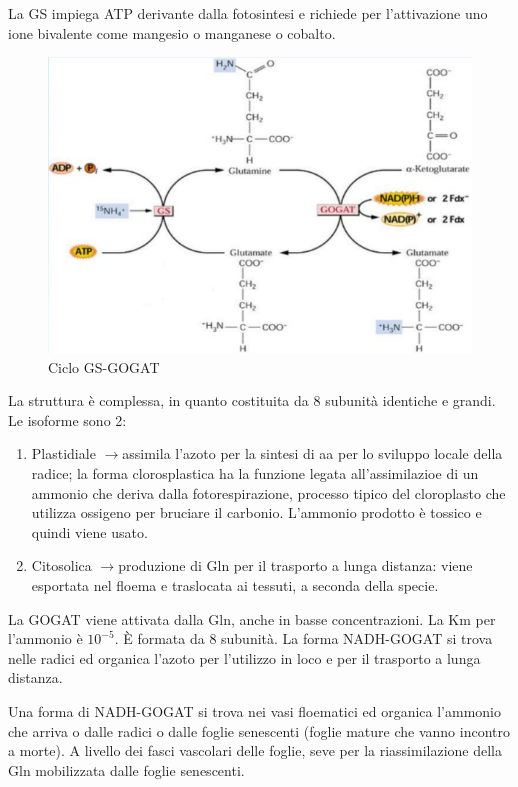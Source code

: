 \documentclass[a4paper,12pt]{book}
\newcommand{\freccia}{\ensuremath{\rightarrow}}
\newcommand{\lfreccia}{\ensuremath{\longrightarrow}}
\begin{document}
La GS impiega ATP derivante dalla fotosintesi e richiede per l'attivazione uno ione bivalente come mangesio o manganese o cobalto. 
\begin{figure}[H]
\centering
\includegraphics[scale=0.4]{immagini/ciclo1.jpg}
\caption{Ciclo GS-GOGAT}
\end{figure}

La struttura è complessa, in quanto costituita da 8 subunità identiche e grandi. Le isoforme sono 2:
\begin{enumerate}
    \item{Plastidiale \lfreccia assimila l'azoto per la sintesi di aa per lo sviluppo locale della radice; la forma clorosplastica ha la funzione legata all'assimilazioe di un ammonio che deriva dalla fotorespirazione, processo tipico del cloroplasto che utilizza ossigeno per bruciare il carbonio. L'ammonio prodotto è tossico e quindi viene usato.}
    \item{Citosolica \freccia produzione di Gln per il trasporto a lunga distanza: viene esportata nel floema e traslocata ai tessuti, a seconda della specie.}
\end{enumerate}

La GOGAT viene attivata dalla Gln, anche in basse concentrazioni. La Km per l'ammonio è $10^{-5}$. È formata da 8 subunità.
La forma NADH-GOGAT si trova nelle radici ed organica l'azoto per l'utilizzo in loco e per il trasporto a lunga distanza. 

Una forma di NADH-GOGAT si trova nei vasi floematici ed organica l'ammonio che arriva o dalle radici o dalle foglie senescenti (foglie mature che vanno incontro a morte). A livello dei fasci vascolari delle foglie, seve per la riassimilazione della Gln mobilizzata dalle foglie senescenti.
\end{document}

